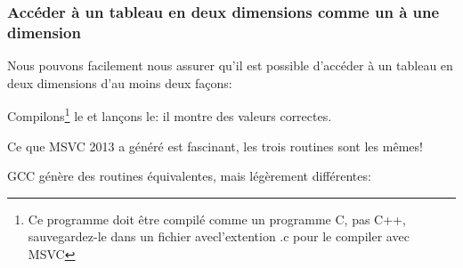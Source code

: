 ﻿\subsubsection{Accéder à un tableau en deux dimensions comme un à une dimension}

Nous pouvons facilement nous assurer qu'il est possible d'accéder à un tableau en
deux dimensions d'au moins deux façons:



Compilons\footnote{Ce programme doit être compilé comme un programme C, pas C++,
sauvegardez-le dans un fichier avecl'extention .c pour le compiler avec MSVC} le et
lançons le: il montre des valeurs correctes.

Ce que MSVC 2013 a généré est fascinant, les trois routines sont les mêmes!



GCC génère des routines équivalentes, mais légèrement différentes:




